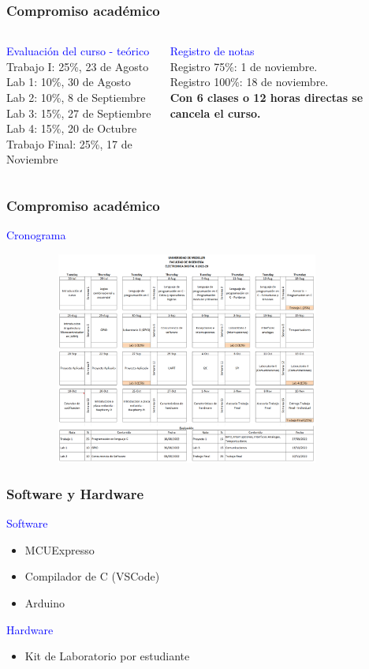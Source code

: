 \documentclass[10.5pt,scale=1.0,t,aspectratio=169,hyperref={pdfpagelabels=false}]{beamer}
\begin{document}
\begin{frame}
	\frametitle{Compromiso académico}
	
	\begin{columns}
			\textcolor{blue}{\large Evaluación del curso - teórico} \\
			Trabajo I: 25\%, 23 de Agosto\\
			Lab 1: 10\%, 30 de Agosto\\ 
			Lab 2: 10\%, 8 de Septiembre\\
			Lab 3: 15\%, 27 de Septiembre\\ 
			Lab 4: 15\%, 20 de Octubre\\
			Trabajo Final: 25\%, 17 de Noviembre\\
			\vspace{0.5cm}
			
			\textcolor{blue}{\large Registro de notas} \\
			Registro 75\%: 1 de noviembre. \\
			Registro 100\%: 18 de noviembre. \\
			
			\textbf{Con 6 clases o 12 horas directas se cancela el curso. }
	\end{columns}
\end{frame}
\begin{frame}
	\frametitle{Compromiso académico}
	\textcolor{blue}{\large Cronograma}
	\vspace{-0.2in} 		
	\begin{figure}
		\centering
		\includegraphics[width=10cm,height=7cm]{CronogramaElectronicaDigitalII}
	\end{figure}
\end{frame}
\begin{frame}
	\frametitle{Software y Hardware}
	\textcolor{blue}{Software}
	\begin{itemize}
		\item MCUExpresso
		\item Compilador de C (VSCode)
		\item Arduino 
	\end{itemize}
	
	\textcolor{blue}{Hardware}
	\begin{itemize}
		\item Kit de Laboratorio por estudiante
	\end{itemize}
\end{frame}
\end{document}
